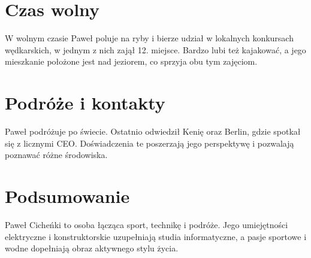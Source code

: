 \section*{Czas wolny}
W wolnym czasie Paweł poluje na ryby i bierze udział w lokalnych konkursach wędkarskich, w jednym z nich zajął 12. miejsce. Bardzo lubi też kajakować, a jego mieszkanie położone jest nad jeziorem, co sprzyja obu tym zajęciom.

\section*{Podróże i kontakty}
Paweł podróżuje po świecie. Ostatnio odwiedził Kenię oraz Berlin, gdzie spotkał się z licznymi CEO. Doświadczenia te poszerzają jego perspektywę i pozwalają poznawać różne środowiska.

\section*{Podsumowanie}
Paweł Cicheńki to osoba łącząca sport, technikę i podróże. Jego umiejętności elektryczne i konstruktorskie uzupełniają studia informatyczne, a pasje sportowe i wodne dopełniają obraz aktywnego stylu życia.
